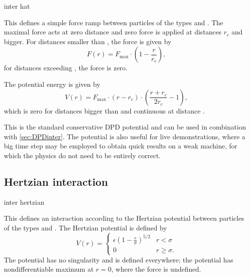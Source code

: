 \begin{essyntax}
  inter  
  hat  
  \begin{features}
  \end{features}
\end{essyntax}
This defines a simple force ramp between particles of the types  and
 . The maximal force  acts at zero distance and 
zero force is applied at distances $r_c$ and bigger. For distances smaller than 
, the force is given by
\begin{equation}
  F(r)=F_{\text{max}} \cdot \left( 1 - \frac{r}{r_c} \right),
\end{equation}
for distances exceeding , the force is zero.

The potential energy is given by
\begin{equation}
  V(r)=F_{\text{max}} \cdot (r-r_c) \cdot \left( \frac{r+r_c}{2r_c} - 1 \right),
\end{equation}
which is zero for distances bigger than  and continuous at distance 
.

This is the standard conservative DPD potential and can be used in combination 
with  \ref{sec:DPDinter}. The potential is also useful for live 
demonstrations, where a big time step may be employed to obtain quick results
on a weak machine, for which the physics do not need to be entirely correct.  

\subsection{Hertzian interaction}

\begin{essyntax}
  inter  
  hertzian \var{\sigma} \var{\epsilon}
  \begin{features}
  \end{features}
\end{essyntax}
This defines an interaction according to the Hertzian potential
between particles of the types  and . The
Hertzian potential is defined by
\begin{equation}
  V(r)=
  \begin{cases} \epsilon\left(1-\frac{r}{\sigma}\right)^{5/2} & r < \sigma\\
    0 & r \ge \sigma.
  \end{cases}
\end{equation}
The potential has no singularity and is defined everywhere; the
potential has nondifferentiable maximum at $r=0$, where the force is
undefined.

